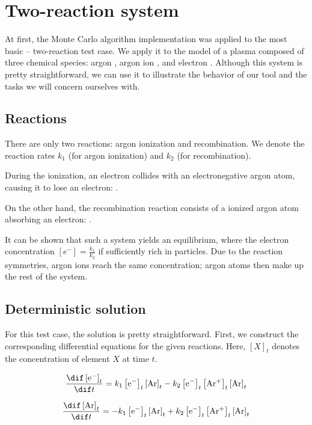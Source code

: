 \chapter{Two-reaction system}

At first, the Monte Carlo algorithm implementation was applied to the most basic -- two-reaction test case. We apply it to the model of a plasma composed of three chemical species: argon ,  argon ion , and electron . Although this system is pretty straightforward, we can use it to illustrate the behavior of our tool and the tasks we will concern ourselves with.

\section{Reactions}

There are only two reactions: argon ionization and recombination. We denote the reaction rates $k_1$ (for argon ionization) and $k_2$ (for recombination).

During the ionization, an electron collides with an electronegative argon atom, causing it to lose an electron:
.

On the other hand, the recombination reaction consists of a ionized argon atom absorbing an electron: 
.

It can be shown that such a system yields an equilibrium, where the electron concentration $\left[ e^{-} \right] = \frac{k_1}{k_2}$ if sufficiently rich in particles. Due to the reaction symmetries, argon ions reach the same concentration; argon atoms then make up the rest of the system.

\section{Deterministic solution}

For this test case, the solution is pretty straightforward. First, we construct the corresponding differential equations for the given reactions. Here, $\left[ X\right]_t$ denotes the concentration of element $X$ at time $t$. 

$$ \frac{\dif \left[ \rm e^{-} \right]_t}{\dif t} = k_1\left[ \rm e^{-}\right]_t \left[ \rm Ar\right]_t - k_2 \left[ \rm e^{-}\right]_t \left[ \rm Ar^{+}\right]_t \left[ \rm Ar\right]_t$$

$$\frac{\dif \left[\rm Ar\right]_t}{\dif t} = - k_1\left[ \rm e^{-}\right]_t \left[ \rm Ar\right]_t + k_2 \left[ \rm e^{-}\right]_t \left[ \rm Ar^{+}\right]_t \left[ \rm Ar\right]_t$$


